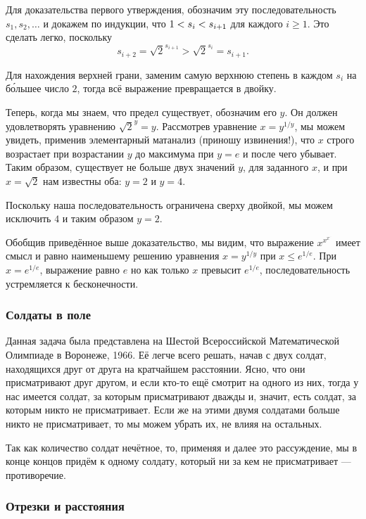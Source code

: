 Для доказательства первого утверждения, обозначим эту последовательность
$s_1, s_2,\dots$ и докажем по индукции, что $1<s_i\z<s_{i+1}$
для каждого $i\ge 1$.
Это сделать легко, поскольку \[s_{i+2}=
{\sqrt{2}}^{s_{i+1}}
>{\sqrt{2}}^{s_{i}}
=s_{i+1}.\]

Для нахождения верхней грани, заменим самую верхнюю степень в каждом $s_i$ на б\'{о}льшее число $2$, тогда всё выражение превращается в двойку.

Теперь, когда мы знаем, что предел существует, обозначим его $y$.
Он должен удовлетворять уравнению ${\sqrt{2}}^y=y$.
Рассмотрев уравнение $x=y^{1/y}$, 
мы можем увидеть, применив элементарный матанализ (приношу извинения!), 
что $x$ строго возрастает при возрастании $y$ до максимума при $y=e$
и после чего убывает.
Таким образом, существует не больше двух значений $y$, для заданного $x$, 
и при $x=\sqrt{2}$ нам известны оба: $y=2$ и $y=4$.

Поскольку наша последовательность ограничена сверху двойкой, мы можем исключить $4$ и таким образом $y=2$.\heart

Обобщив приведённое выше доказательство, мы видим, что выражение $x^{x^{x^{{\cdot}^{\cdot}}}}$
имеет смысл и равно наименьшему решению уравнения $x=y^{1/y}$ при $x\le e^{1/e}$.
При $x=e^{1/e}$, выражение равно $e$ но как только $x$ превысит $e^{1/e}$, последовательность устремляется к бесконечности.

\subsubsection*{Солдаты в поле}%

Данная задача была представлена на Шестой Всероссийской Математической Олимпиаде в Воронеже, 1966.
Её легче всего решать, начав с двух солдат, находящихся друг от друга на кратчайшем расстоянии.
Ясно, что они присматривают друг другом, и если кто-то ещё смотрит на одного из них, тогда у нас имеется солдат, за которым присматривают дважды и, значит, есть солдат, за которым никто не присматривает.
Если же на этими двумя солдатами больше никто не присматривает, то мы можем убрать их, не влияя на остальных.

Так как количество солдат нечётное, то, применяя и далее это рассуждение, мы в конце концов придём к одному солдату, который ни за кем не присматривает --- противоречие.\heart

\subsubsection*{Отрезки и расстояния} %

